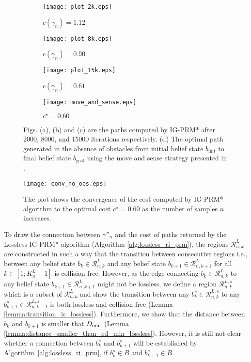 \documentclass[Afour,sageh,times]{sagej}
\begin{document}
\begin{figure*}[ht]
        \centering
 \captionsetup[subfigure]{justification=centering}
 \centering
 \begin{subfigure}{0.24\textwidth}
{\texttt{[image: plot\_2k.eps]}}
\caption{$c(\gamma_n)=1.12$}
 \end{subfigure}
 \begin{subfigure}{0.24\textwidth}
 \texttt{[image: plot\_8k.eps]}
 \caption{$c(\gamma_n)=0.90$}
 \end{subfigure}
  \begin{subfigure}{0.24\textwidth}
{\texttt{[image: plot\_15k.eps]}}
\caption{$c(\gamma_n)=0.61$}
 \end{subfigure}
 \begin{subfigure}{0.24\textwidth}
 \texttt{[image: move\_and\_sense.eps]}
\caption{$c^\star=0.60$}
\end{subfigure}
 \caption{Figs. (a), (b) and (c) are the paths computed by IG-PRM* after 2000, 8000, and 15000 iterations respectively. (d) The optimal path generated in the absence of obstacles from initial belief state $b_{\text{init}}$ to final belief state $b_{\text{goal}}$ using the move and sense strategy presented in \cite{pedram2021gaussian}.}
\label{fig:evolution_of_path}
\vspace{-2ex}
\end{figure*}
\begin{figure}[ht!]
\centering
\texttt{[image: conv\_no\_obs.eps]}
\caption{The plot shows the convergence of the cost computed by IG-PRM* algorithm to the optimal cost $c^\star=0.60$ as the number of samples $n$ increases.}
\label{fig:conv_no_obs}
\end{figure}
To draw the connection between $\gamma''_n$ and the cost of paths returned by the Lossless IG-PRM* algorithm (Algorithm \ref{alg:lossless_ri_prm}), the regions $\mathcal{R}^L_{n,k}$ are constructed in such a way that the transition between consecutive regions i.e., between any belief state  $b_k \in \mathcal{R}^L_{n,k}$ and any belief state $b_{k+1} \in \mathcal{R}^L_{n,k+1}$ for all $k\in[1;K^L_n-1]$ is collision-free. However, as the edge connecting $b_k \in \mathcal{R}^L_{n,k}$ to any belief state $b_{k+1} \in \mathcal{R}^L_{n,k+1}$ might not be lossless, we define a region $\mathcal{R}^{L,s}_{n,k}$ which is a subset of $\mathcal{R}^L_{n,k}$ and show the transition between any $b^s_k \in \mathcal{R}^{L,s}_{n,k}$ to any $b^s_{k+1} \in \mathcal{R}^{L,s}_{n,k+1}$ is both lossless and collision-free (Lemma \ref{lemma:transition_is_lossless}). Furthermore, we show that the distance between $b_k$ and $b_{k+1}$ is smaller that $D_{\textup{min}}$ (Lemma \ref{lemma:distance_smaller_than_ed_min_lossless}). However, it is still not clear whether a connection between $b_k^s$ and $b_{k+1}^s$ will be established by Algorithm~\ref{alg:lossless_ri_prm}, if $b^s_k \in B$ and $b^s_{k+1} \in B$.
\end{document}
